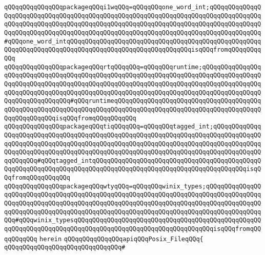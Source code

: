 \verb|qQQqqQQqqQQqqQQqpackageqQQqi1wqQQq=qQQqqQQqone_word_int;qQQqqQQqqQQqqQQqqQQqqQQqqQQqqQQqqQQqqQQqqQQqqQQqqQQqqQQqqQQqqQQqqQQqqQQqqQQqqQQqqQQqqQQqqQQqqQQqqQQqqQQqqQQqqQQqqQQqqQQqqQQqqQQqqQQqqQQqqQQqqQQqqQQqqQQqqQQqqQQqqQQqqQQqqQQqqQQqqQQqqQQqqQQqqQQqqQQqqQQqqQQqqQQqqQQqqQQqqQQqqQQq#qQQqone_word_intqQQqqQQqqQQqqQQqqQQqqQQqqQQqqQQqqQQqqQQqqQQqqQQqqQQqqQQqqQQqqQQqqQQqqQQqqQQqqQQqqQQqqQQqqQQqqQQqqQQqqQQqisqQQqfromqQQqqQQqqQQq|\newline
\verb|qQQqqQQqqQQqqQQqpackageqQQqrtqQQqqQQq=qQQqqQQqruntime;qQQqqQQqqQQqqQQqqQQqqQQqqQQqqQQqqQQqqQQqqQQqqQQqqQQqqQQqqQQqqQQqqQQqqQQqqQQqqQQqqQQqqQQqqQQqqQQqqQQqqQQqqQQqqQQqqQQqqQQqqQQqqQQqqQQqqQQqqQQqqQQqqQQqqQQqqQQqqQQqqQQqqQQqqQQqqQQqqQQqqQQqqQQqqQQqqQQqqQQqqQQqqQQqqQQqqQQqqQQqqQQqqQQqqQQqqQQqqQQqqQQq#qQQqruntimeqQQqqQQqqQQqqQQqqQQqqQQqqQQqqQQqqQQqqQQqqQQqqQQqqQQqqQQqqQQqqQQqqQQqqQQqqQQqqQQqqQQqqQQqqQQqqQQqqQQqqQQqqQQqqQQqqQQqqQQqqQQqisqQQqfromqQQqqQQqqQQq|\newline
\verb|qQQqqQQqqQQqqQQqpackageqQQqtiqQQqqQQq=qQQqqQQqtagged_int;qQQqqQQqqQQqqQQqqQQqqQQqqQQqqQQqqQQqqQQqqQQqqQQqqQQqqQQqqQQqqQQqqQQqqQQqqQQqqQQqqQQqqQQqqQQqqQQqqQQqqQQqqQQqqQQqqQQqqQQqqQQqqQQqqQQqqQQqqQQqqQQqqQQqqQQqqQQqqQQqqQQqqQQqqQQqqQQqqQQqqQQqqQQqqQQqqQQqqQQqqQQqqQQqqQQqqQQqqQQqqQQqqQQqqQQq#qQQqtagged_intqQQqqQQqqQQqqQQqqQQqqQQqqQQqqQQqqQQqqQQqqQQqqQQqqQQqqQQqqQQqqQQqqQQqqQQqqQQqqQQqqQQqqQQqqQQqqQQqqQQqqQQqqQQqqQQqisqQQqfromqQQqqQQqqQQq|\newline
\verb|qQQqqQQqqQQqqQQqpackageqQQqwtyqQQq=qQQqqQQqwinix_types;qQQqqQQqqQQqqQQqqQQqqQQqqQQqqQQqqQQqqQQqqQQqqQQqqQQqqQQqqQQqqQQqqQQqqQQqqQQqqQQqqQQqqQQqqQQqqQQqqQQqqQQqqQQqqQQqqQQqqQQqqQQqqQQqqQQqqQQqqQQqqQQqqQQqqQQqqQQqqQQqqQQqqQQqqQQqqQQqqQQqqQQqqQQqqQQqqQQqqQQqqQQqqQQqqQQqqQQqqQQqqQQqqQQq#qQQqwinix_typesqQQqqQQqqQQqqQQqqQQqqQQqqQQqqQQqqQQqqQQqqQQqqQQqqQQqqQQqqQQqqQQqqQQqqQQqqQQqqQQqqQQqqQQqqQQqqQQqqQQqqQQqqQQqisqQQqfromqQQqqQQqqQQq|\newline
\verb|herein|\newline
\newline
\verb|qQQqqQQqqQQqqQQqapiqQQqPosix_FileqQQq{|\newline
\verb|qQQqqQQqqQQqqQQqqQQqqQQqqQQqqQQq#|\newline

